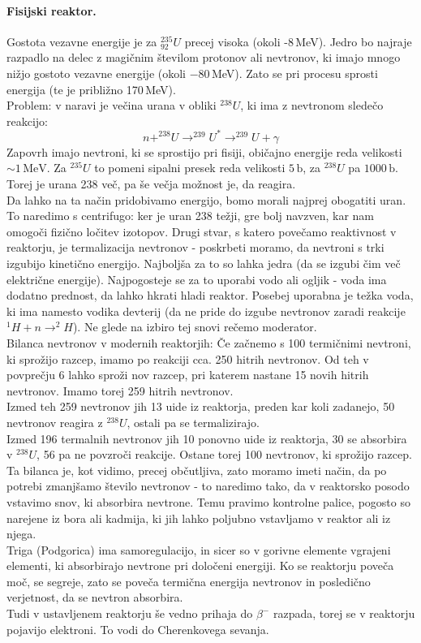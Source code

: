 \documentclass[a4paper]{article}
\begin{document}
\paragraph{Fisijski reaktor.} Gostota vezavne energije je za $^{235}_{92}U$ precej visoka (okoli -8\,MeV). Jedro bo najraje razpadlo na delec z magičnim številom protonov ali nevtronov, ki imajo mnogo nižjo gostoto vezavne energije (okoli $-80\,$MeV). Zato se pri procesu sprosti energija (te je približno 170\,MeV). \\
Problem: v naravi je večina urana v obliki $^{238}U$, ki ima z nevtronom sledečo reakcijo:
$$n + ^{238}U \to ^{239}U^* \to ^{239}U + \gamma$$
Zapovrh imajo nevtroni, ki se sprostijo pri fisiji, običajno energije reda velikosti $\sim1\,\mathrm{MeV}$. Za $^{235}U$ to pomeni sipalni presek reda velikosti $5\,\mathrm{b}$, za $^{238}U$ pa $1000\,\mathrm{b}$. Torej je urana 238 več, pa še večja možnost je, da reagira. \\
Da lahko na ta način pridobivamo energijo, bomo morali najprej obogatiti uran. To naredimo s centrifugo: ker je uran 238 težji, gre bolj navzven, kar nam omogoči fizično ločitev izotopov.
Drugi stvar, s katero povečamo reaktivnost v reaktorju, je termalizacija nevtronov - poskrbeti moramo, da nevtroni s trki izgubijo kinetično energijo. Najboljša za to so lahka jedra (da se izgubi čim več električne energije).
Najpogosteje se za to uporabi vodo ali ogljik - voda ima dodatno prednost, da lahko hkrati hladi reaktor. Posebej uporabna je težka voda, ki ima namesto vodika devterij (da ne pride do izgube nevtronov zaradi reakcije $^1H + n \to ^2H$).
Ne glede na izbiro tej snovi rečemo moderator. \\[2mm]
Bilanca nevtronov v modernih reaktorjih: Če začnemo s 100 termičnimi nevtroni, ki sprožijo razcep, imamo po reakciji cca. 250 hitrih nevtronov. Od teh v povprečju 6 lahko sproži nov razcep, pri katerem nastane 15 novih hitrih nevtronov. Imamo torej 259 hitrih nevtronov. \\
Izmed teh 259 nevtronov jih 13 uide iz reaktorja, preden kar koli zadanejo, 50 nevtronov reagira z $^238U$, ostali pa se termalizirajo. \\
Izmed 196 termalnih nevtronov jih 10 ponovno uide iz reaktorja, 30 se absorbira v $^{238}U$, 56 pa ne povzroči reakcije. Ostane torej 100 nevtronov, ki sprožijo razcep. \\[2mm]
Ta bilanca je, kot vidimo, precej občutljiva, zato moramo imeti način, da po potrebi zmanjšamo število nevtronov - to naredimo tako, da v reaktorsko posodo vstavimo snov, ki absorbira nevtrone.
Temu pravimo kontrolne palice, pogosto so narejene iz bora ali kadmija, ki jih lahko poljubno vstavljamo v reaktor ali iz njega. \\[2mm]
Triga (Podgorica) ima samoregulacijo, in sicer so v gorivne elemente vgrajeni elementi, ki absorbirajo nevtrone pri določeni energiji. Ko se reaktorju poveča moč, se segreje, zato se poveča termična energija nevtronov in posledično verjetnost, da se nevtron absorbira. \\[2mm]
Tudi v ustavljenem reaktorju še vedno prihaja do $\beta^-$ razpada, torej se v reaktorju pojavijo elektroni. To vodi do Cherenkovega sevanja.
\end{document}
